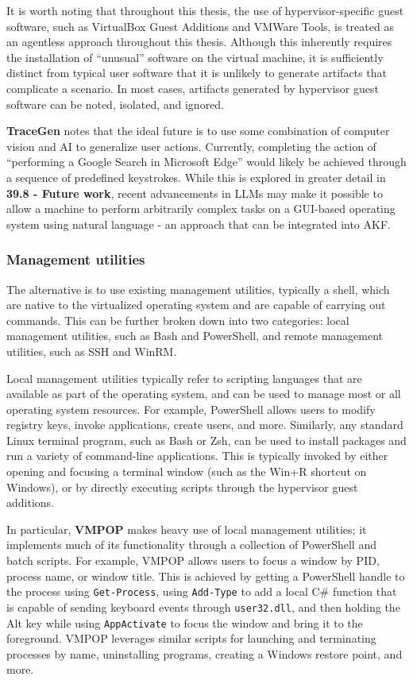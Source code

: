 It is worth noting that throughout this thesis, the use of
hypervisor-specific guest software, such as VirtualBox Guest Additions
and VMWare Tools, is treated as an agentless approach throughout this
thesis. Although this inherently requires the installation of
``unusual'' software on the virtual machine, it is sufficiently distinct
from typical user software that it is unlikely to generate artifacts
that complicate a scenario. In most cases, artifacts generated by
hypervisor guest software can be noted, isolated, and ignored.

\textbf{TraceGen} notes that the ideal future is to use some combination
of computer vision and AI to generalize user actions. Currently,
completing the action of ``performing a Google Search in Microsoft
Edge'' would likely be achieved through a sequence of predefined
keystrokes. While this is explored in greater detail in \textbf{39.8 -
Future work}, recent advancements in LLMs may make it possible to allow
a machine to perform arbitrarily complex tasks on a GUI-based operating
system using natural language - an approach that can be integrated into
AKF.

\subsubsection{Management utilities}\label{management-utilities}

The alternative is to use existing management utilities, typically a
shell, which are native to the virtualized operating system and are
capable of carrying out commands. This can be further broken down into
two categories: local management utilities, such as Bash and PowerShell,
and remote management utilities, such as SSH and WinRM.

Local management utilities typically refer to scripting languages that
are available as part of the operating system, and can be used to manage
most or all operating system resources. For example, PowerShell allows
users to modify registry keys, invoke applications, create users, and
more. Similarly, any standard Linux terminal program, such as Bash or
Zsh, can be used to install packages and run a variety of command-line
applications. This is typically invoked by either opening and focusing a
terminal window (such as the Win+R shortcut on Windows), or by directly
executing scripts through the hypervisor guest additions.

In particular, \textbf{VMPOP} makes heavy use of local management
utilities; it implements much of its functionality through a collection
of PowerShell and batch scripts. For example, VMPOP allows users to
focus a window by PID, process name, or window title. This is achieved
by getting a PowerShell handle to the process using
\texttt{Get-Process}, using \texttt{Add-Type} to add a local C\#
function that is capable of sending keyboard events through
\texttt{user32.dll}, and then holding the Alt key while using
\texttt{AppActivate} to focus the window and bring it to the foreground.
VMPOP leverages similar scripts for launching and terminating processes
by name, uninstalling programs, creating a Windows restore point, and
more.

